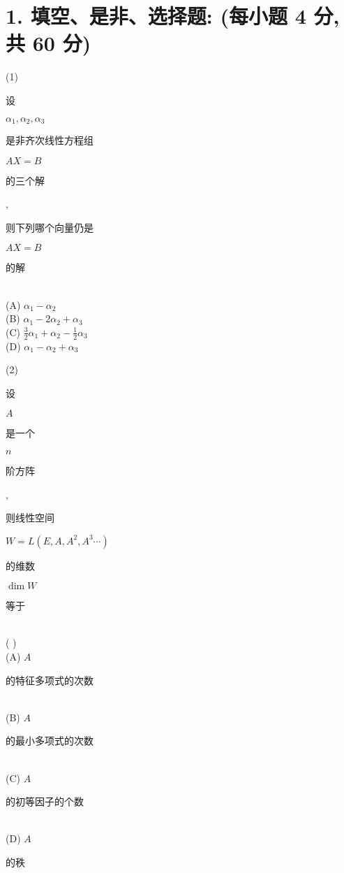 \documentclass[10pt]{article}
\begin{document}
\section{1. 填空、是非、选择题: (每小题 4 分, 共 60 分)}
(1) \begin{CJK}{UTF8}{mj}设\end{CJK} $\alpha_{1}, \alpha_{2}, \alpha_{3}$ \begin{CJK}{UTF8}{mj}是非齐次线性方程组\end{CJK} $A X=B$ \begin{CJK}{UTF8}{mj}的三个解\end{CJK},\begin{CJK}{UTF8}{mj}则下列哪个向量仍是\end{CJK} $A X=B$ \begin{CJK}{UTF8}{mj}的解\end{CJK}\\
(A) $\alpha_{1}-\alpha_{2}$\\
(B) $\alpha_{1}-2 \alpha_{2}+\alpha_{3}$\\
(C) $\frac{3}{2} \alpha_{1}+\alpha_{2}-\frac{1}{2} \alpha_{3}$\\
(D) $\alpha_{1}-\alpha_{2}+\alpha_{3}$

(2) \begin{CJK}{UTF8}{mj}设\end{CJK} $A$ \begin{CJK}{UTF8}{mj}是一个\end{CJK} $n$ \begin{CJK}{UTF8}{mj}阶方阵\end{CJK}, \begin{CJK}{UTF8}{mj}则线性空间\end{CJK} $W=L\left(E, A, A^{2}, A^{3} \cdots\right)$ \begin{CJK}{UTF8}{mj}的维数\end{CJK} $\operatorname{dim} W$ \begin{CJK}{UTF8}{mj}等于\end{CJK}\\
( )\\
(A) $A$ \begin{CJK}{UTF8}{mj}的特征多项式的次数\end{CJK}\\
(B) $A$ \begin{CJK}{UTF8}{mj}的最小多项式的次数\end{CJK}\\
(C) $A$ \begin{CJK}{UTF8}{mj}的初等因子的个数\end{CJK}\\
(D) $A$ \begin{CJK}{UTF8}{mj}的秩\end{CJK}
\end{document}
